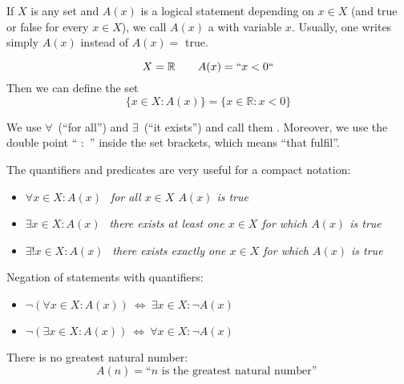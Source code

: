

\begin{Definition}[Predicate]
If $X$ is any set and $A(x)$ is a logical statement depending on $x \in X$ (and true or false for every $x\in X$),
we call $A(x)$ a  with variable $x$.
Usually, one writes simply $A(x)$ instead of $A(x)=$ true. 
\end{Definition}

\begin{example}{}
\[
 X=\mathbb{R}\qquad   A(x) = ``x < 0``
\]
Then we can define the set
	$$
	\{ x \in X : A(x) \}	= \{ x \in \mathbb{R} : x < 0 \}
	$$
\end{example}

\begin{Definition}
We use
$\forall$~(``for all'') and $\exists$~(``it exists'')
and call them .
Moreover, we use
the double point `` $:$ '' inside the set brackets, which means
``that fulfil''.  
\end{Definition}


The quantifiers and predicates are very useful for a compact notation:
\begin{itemize}
 \item $\forall x \in X : A(x)~~$  \emph{for all $x\in X$ $A(x)$ is true}
 \item $\exists x \in X : A(x)~~$  \emph{there exists at least one $x\in X$ for which $A(x)$ is true}
 \item $\exists! x \in X : A(x)~~$ \emph{there exists exactly one $x\in X$ for which $A(x)$ is true}
\end{itemize}

Negation of statements with quantifiers:
\begin{itemize}
 \item $\neg (\forall x \in X : A(x)) ~\Leftrightarrow~ \exists x \in X : \neg A(x)$
 \item $\neg (\exists x \in X : A(x)) ~\Leftrightarrow~ \forall x \in X : \neg A(x)$
\end{itemize}

\begin{example}
There is no greatest natural number:
\[
 A(n) = \text{``}n \mbox{ is the greatest natural number'' }
\]
\end{example}

